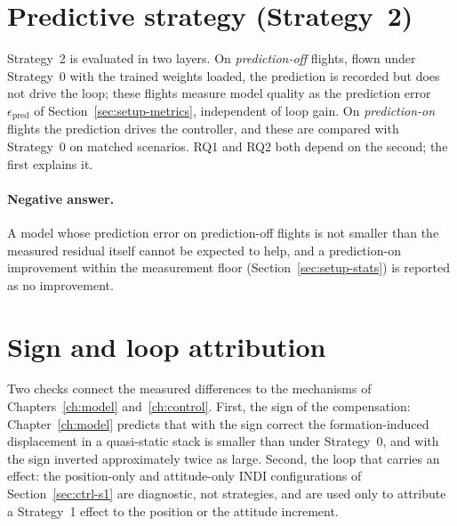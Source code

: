 \section{Predictive strategy (Strategy~2)}
\label{sec:res2-nn}

Strategy~2 is evaluated in two layers. On \emph{prediction-off} flights, flown under Strategy~0 with
the trained weights loaded, the prediction is recorded but does not drive the loop; these flights
measure model quality as the prediction error $\epsilon_{\mathrm{pred}}$ of
Section~\ref{sec:setup-metrics}, independent of loop gain. On \emph{prediction-on} flights the
prediction drives the controller, and these are compared with Strategy~0 on matched scenarios. RQ1
and RQ2 both depend on the second; the first explains it.



\paragraph{Negative answer.} A model whose prediction error on prediction-off flights is not smaller
than the measured residual itself cannot be expected to help, and a prediction-on improvement
within the measurement floor (Section~\ref{sec:setup-stats}) is reported as no improvement.

\section{Sign and loop attribution}
\label{sec:res2-attribution}

Two checks connect the measured differences to the mechanisms of Chapters~\ref{ch:model}
and~\ref{ch:control}. First, the sign of the compensation: Chapter~\ref{ch:model} predicts that with
the sign correct the formation-induced displacement in a quasi-static stack is smaller than under
Strategy~0, and with the sign inverted approximately twice as large. Second, the loop that carries
an effect: the position-only and attitude-only INDI configurations of Section~\ref{sec:ctrl-s1} are
diagnostic, not strategies, and are used only to attribute a Strategy~1 effect to the position or
the attitude increment.

